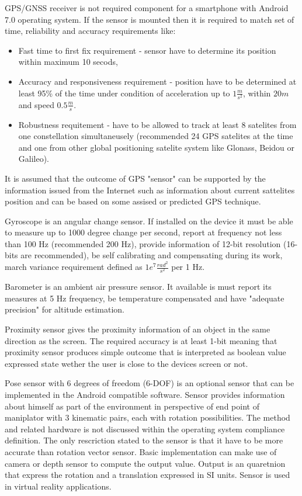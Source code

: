 \documentclass[../main.tex]{subfiles}
\begin{document}
GPS/GNSS receiver is not required component for a smartphone with Android 7.0 operating system. If the sensor is mounted then it is required to match set of time, reliability and accuracy requirements like:
\begin{itemize}
	\item Fast time to first fix requirement - sensor have to determine its position within maximum 10 secods,
	\item Accuracy and responsiveness requirement - position have to be determined at least 95\% of the time under condition of acceleration up to $ 1 \frac{m}{s^2} $, within $ 20 m $ and speed $ 0.5 \frac{m}{s} $.
	\item Robustness requitement - have to be allowed to track at least 8 satelites from one constellation simultaneusely (recommended 24 GPS satelites at the time and one from other global positioning satelite system like Glonass, Beidou or Galileo).
\end{itemize}
It is assumed that the outcome of GPS "sensor" can be supported by the information issued from the Internet such as information about current sattelites position and can be based on some assised or predicted GPS technique.

Gyroscope is an angular change sensor. If installed on the device it must be able to measure up to 1000 degree change per second, report at frequency not less than 100 Hz (recommended 200 Hz), provide information of 12-bit resolution (16-bits are recommended), be self calibrating and compensating during its work, march variance requirement defined as $ 1e^7 \frac{rad^2}{s^2} $ per 1 Hz.

Barometer is an ambient air pressure sensor. It available is must report its measures at 5 Hz frequency, be temperature compensated and have "adequate precision" for altitude estimation.

Proximity sensor gives the proximity information of an object in the same direction as the screen. The required accuracy is at least 1-bit meaning that proximity sensor produces simple outcome that is interpreted as boolean value expressed state wether the user is close to the devices screen or not.

Pose sensor with 6 degrees of freedom (6-DOF) is an optional sensor that can be implemented in the Android compatible software. Sensor provides information about himself as part of the environment in perspective of end point of maniplator with 3 kinematic pairs, each with rotation possibilities. The method and related hardware is not discussed within the operating system compliance definition. The only rescriction stated to the sensor is that it have to be more accurate than rotation vector sensor. Basic implementation can make use of camera or depth sensor to compute the output value. Output is an quaretnion that express the rotation and a translation expressed in SI units. Sensor is used in virtual reality applications.
\end{document}
